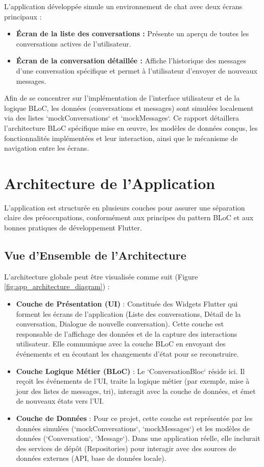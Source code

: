 \documentclass[12pt,a4paper]{article}
\begin{document}
L'application développée simule un environnement de chat avec deux écrans principaux :
\begin{itemize}
    \item \textbf{Écran de la liste des conversations :} Présente un aperçu de toutes les conversations actives de l'utilisateur.
    \item \textbf{Écran de la conversation détaillée :} Affiche l'historique des messages d'une conversation spécifique et permet à l'utilisateur d'envoyer de nouveaux messages.
\end{itemize}
Afin de se concentrer sur l'implémentation de l'interface utilisateur et de la logique BLoC, les données (conversations et messages) sont simulées localement via des listes `mockConversations` et `mockMessages`. Ce rapport détaillera l'architecture BLoC spécifique mise en œuvre, les modèles de données conçus, les fonctionnalités implémentées et leur interaction, ainsi que le mécanisme de navigation entre les écrans.

\section{Architecture de l'Application}
L'application est structurée en plusieurs couches pour assurer une séparation claire des préoccupations, conformément aux principes du pattern BLoC et aux bonnes pratiques de développement Flutter.

\subsection{Vue d'Ensemble de l'Architecture}
L'architecture globale peut être visualisée comme suit (Figure \ref{fig:app_architecture_diagram}) :
\begin{itemize}
    \item \textbf{Couche de Présentation (UI)} : Constituée des Widgets Flutter qui forment les écrans de l'application (Liste des conversations, Détail de la conversation, Dialogue de nouvelle conversation). Cette couche est responsable de l'affichage des données et de la capture des interactions utilisateur. Elle communique avec la couche BLoC en envoyant des événements et en écoutant les changements d'état pour se reconstruire.
    \item \textbf{Couche Logique Métier (BLoC)} : Le `ConversationBloc` réside ici. Il reçoit les événements de l'UI, traite la logique métier (par exemple, mise à jour des listes de messages, tri), interagit avec la couche de données, et émet de nouveaux états vers l'UI.
    \item \textbf{Couche de Données} : Pour ce projet, cette couche est représentée par les données simulées (`mockConversations`, `mockMessages`) et les modèles de données (`Conversation`, `Message`). Dans une application réelle, elle inclurait des services de dépôt (Repositories) pour interagir avec des sources de données externes (API, base de données locale).
\end{itemize}
\end{document}

